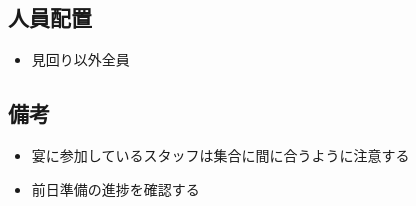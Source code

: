 \subsection{人員配置}
\begin{itemize}
\item 見回り以外全員
\end{itemize}

\subsection{備考}
\begin{itemize}
  \item 宴に参加しているスタッフは集合に間に合うように注意する
  \item 前日準備の進捗を確認する
\end{itemize}

%

